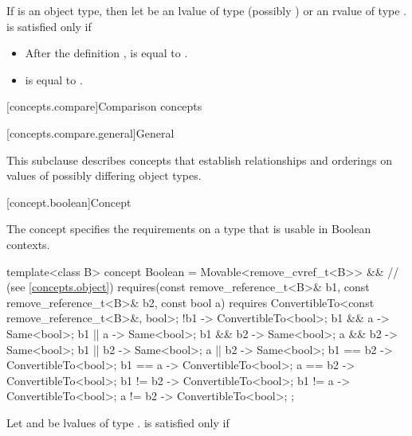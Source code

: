 \begin{itemdescr}
\pnum
If  is an object type, then let  be an lvalue of type
(possibly )  or an rvalue of type .
 is satisfied only if

\begin{itemize}
\item After the definition ,  is equal to .

\item {} is equal to .
\end{itemize}

\end{itemdescr}

[concepts.compare]{Comparison concepts}

[concepts.compare.general]{General}

\pnum
This subclause describes concepts that establish relationships and orderings
on values of possibly differing object types.

[concept.boolean]{Concept }

\pnum
The  concept specifies the requirements on a type that is
usable in Boolean contexts.

%
\begin{itemdecl}
template<class B>
  concept Boolean =
    Movable<remove_cvref_t<B>> && // (see \ref{concepts.object})
    requires(const remove_reference_t<B>& b1,
             const remove_reference_t<B>& b2, const bool a) {
      requires ConvertibleTo<const remove_reference_t<B>&, bool>;
      { !b1 } -> ConvertibleTo<bool>;
      { b1 &&  a } -> Same<bool>;
      { b1 ||  a } -> Same<bool>;
      { b1 && b2 } -> Same<bool>;
      {  a && b2 } -> Same<bool>;
      { b1 || b2 } -> Same<bool>;
      {  a || b2 } -> Same<bool>;
      { b1 == b2 } -> ConvertibleTo<bool>;
      { b1 ==  a } -> ConvertibleTo<bool>;
      {  a == b2 } -> ConvertibleTo<bool>;
      { b1 != b2 } -> ConvertibleTo<bool>;
      { b1 !=  a } -> ConvertibleTo<bool>;
      {  a != b2 } -> ConvertibleTo<bool>;
    };
\end{itemdecl}

\pnum
Let  and  be lvalues of type
.
 is satisfied only if

